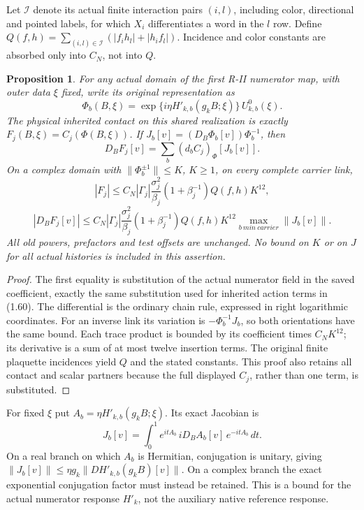 \documentclass{article}
\newtheorem{proposition}{Proposition}
\begin{document}
Let $\mathcal I$ denote its actual finite interaction pairs $(i,l)$, including color, directional and pointed labels, for which $X_i$ differentiates a word in the $l$ row. Define $Q(f,h)=\sum_{(i,l)\in\mathcal I}(|f_i h_l|+|h_i f_l|)$. Incidence and color constants are absorbed only into $C_N$, not into $Q$.

\begin{proposition}
For any actual domain of the first R-II numerator map, with outer data $\xi$ fixed, write its original representation as
\[
 \Phi_b(B,\xi)=\exp\{i\eta H'_{k,b}(g_k B;\xi)\}\,U^0_{k,b}(\xi).
\]
The physical inherited contact on this shared realization is exactly $F_j(B,\xi)=C_j(\Phi(B,\xi))$. If $J_b[v]=(D_B\Phi_b[v])\Phi_b^{-1}$, then
\[
 D_B F_j[v]=\sum_b(d_b C_j)_{\Phi}[J_b[v]].
\]
On a complex domain with $\|\Phi_b^{\pm1}\|\le K$, $K\ge1$, on every complete carrier link,
\[
 |F_j|\le C_N|\Gamma_j|\frac{\sigma_j^2}{\beta_j}(1+\beta_j^{-1})Q(f,h)K^{12},
\]
\[
 |D_BF_j[v]|\le C_N|\Gamma_j|\frac{\sigma_j^2}{\beta_j}(1+\beta_j^{-1})Q(f,h)K^{12}
 \max_{b\ {
m in\ carrier}}\|J_b[v]\|.
\]
All old powers, prefactors and test offsets are unchanged. No bound on $K$ or on $J$ for all actual histories is included in this assertion.
\end{proposition}
\begin{proof}
The first equality is substitution of the actual numerator field in the saved coefficient, exactly the same substitution used for inherited action terms in (1.60). The differential is the ordinary chain rule, expressed in right logarithmic coordinates. For an inverse link its variation is $-\Phi_b^{-1}J_b$, so both orientations have the same bound. Each trace product is bounded by its coefficient times $C_NK^{12}$; its derivative is a sum of at most twelve insertion terms. The original finite plaquette incidences yield $Q$ and the stated constants. This proof also retains all contact and scalar partners because the full displayed $C_j$, rather than one term, is substituted.
\end{proof}

For fixed $\xi$ put $A_b=\eta H'_{k,b}(g_kB;\xi)$. Its exact Jacobian is
\[
 J_b[v]=\int_0^1 e^{itA_b}\,iD_BA_b[v]\,e^{-itA_b}\,dt.
\]
On a real branch on which $A_b$ is Hermitian, conjugation is unitary, giving $\|J_b[v]\|\le\eta g_k\|D H'_{k,b}(g_kB)[v]\|$. On a complex branch the exact exponential conjugation factor must instead be retained. This is a bound for the actual numerator response $H'_k$, not the auxiliary native reference response.
\end{document}
